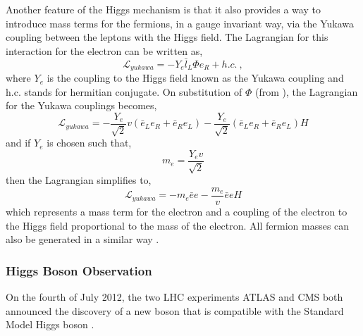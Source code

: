 Another feature of the Higgs mechanism is that it also provides a way to
introduce mass terms for the fermions, in a gauge invariant way, via the Yukawa
coupling between the leptons with the Higgs field. The Lagrangian for this
interaction for the electron can be written as, 
\begin{equation}
\mathcal{L}_{yukawa} = -Y_{e}\bar{l}_L\Phi e_R + h.c. \ ,
\end{equation}
where $Y_{e}$ is the coupling to the Higgs field known as the Yukawa coupling
and h.c. stands for hermitian conjugate. On substitution of $\Phi$ (from
), the Lagrangian for the Yukawa couplings becomes,
\begin{equation}
\mathcal{L}_{yukawa} = 
-\frac{Y_{e}}{\sqrt{2}} v
(\bar{e}_L e_R + \bar{e}_R e_L)
-\frac{Y_{e}}{\sqrt{2}}
(\bar{e}_L e_R + \bar{e}_R e_L)H
\end{equation}
and if $Y_e$ is chosen such that,
\begin{equation}
m_{e} = \frac{Y_{e}v}{\sqrt{2}}
\end{equation}
then the Lagrangian simplifies to,
\begin{equation}
\mathcal{L}_{yukawa} = 
- m_e \bar{e}e
- \frac{m_e}{v} \bar{e}e H
\end{equation}
which represents a mass term for the electron and a coupling of the electron to
the Higgs field proportional to the mass of the electron.
All fermion masses can also be generated in a similar way \cite{halzen1984quarks,ral}.

\subsubsection{Higgs Boson Observation}
On the fourth of July 2012, the two LHC experiments ATLAS and CMS both announced
the discovery of a new boson that is compatible with the Standard Model Higgs
boson \cite{aad2012observation,chatrchyan2012observation}. 

